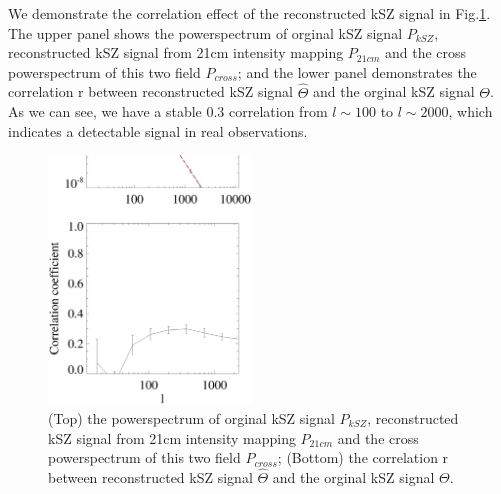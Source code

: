 We demonstrate the correlation effect of the reconstructed kSZ signal in Fig.\ref{fig:powermomen15}. The upper panel shows the powerspectrum of orginal kSZ signal $P_{kSZ}$, reconstructed kSZ signal from 21cm intensity mapping $P_{21cm}$ and the cross powerspectrum of this two field $P_{cross}$; 
and the lower panel demonstrates the correlation r between reconstructed kSZ signal $\hat\Theta$ and the orginal kSZ signal $\Theta$. 
As we can see, we have a stable 0.3 correlation from $l\sim 100$ to $l\sim 2000$, which indicates a detectable signal in real observations.

\begin{figure}[tbp]
	\begin{center}
		\includegraphics[width=0.48\textwidth,height=0.52\textheight]{powermomen15.eps}
	\end{center}
	\vspace{-0.7cm}
	\caption{(Top) the powerspectrum of orginal kSZ signal $P_{kSZ}$, reconstructed kSZ signal from 21cm intensity mapping $P_{21cm}$ and the cross powerspectrum of this two field $P_{cross}$; 
(Bottom) the correlation r between reconstructed kSZ signal $\hat\Theta$ and the orginal kSZ signal $\Theta$.} 
\label{fig:powermomen15}
\end{figure}


